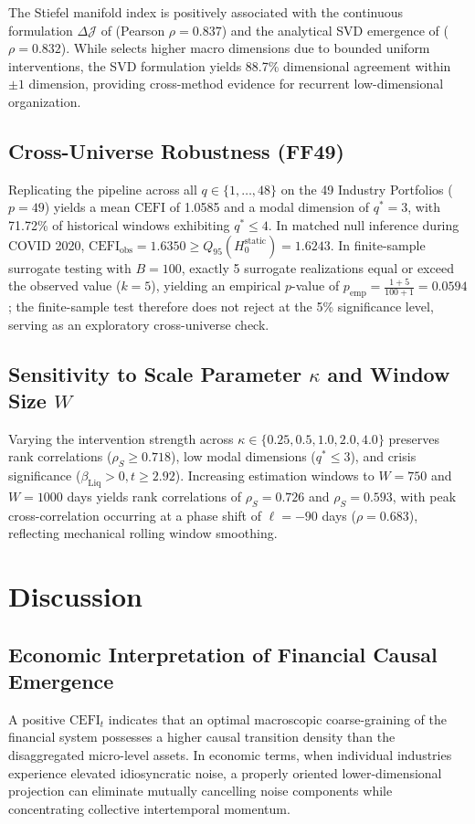 \documentclass[review,12pt,authoryear]{elsarticle}
\begin{document}
The Stiefel manifold index is positively associated with the continuous formulation $\Delta \mathcal{J}$ of \citet{liu2024exact} (Pearson $\rho = 0.837$) and the analytical SVD emergence of \citet{liu2025singular} ($\rho = 0.832$). While \citet{liu2024exact} selects higher macro dimensions due to bounded uniform interventions, the SVD formulation yields 88.7\% dimensional agreement within $\pm 1$ dimension, providing cross-method evidence for recurrent low-dimensional organization.

\subsection{Cross-Universe Robustness (FF49)}
Replicating the pipeline across all $q \in \{1, \dots, 48\}$ on the 49 Industry Portfolios ($p=49$) yields a mean $\mathrm{CEFI}$ of 1.0585 and a modal dimension of $q^* = 3$, with 71.72\% of historical windows exhibiting $q^* \le 4$. In matched null inference during COVID 2020, $\mathrm{CEFI}_{\text{obs}} = 1.6350 \ge Q_{95}(H_0^{\text{static}}) = 1.6243$. In finite-sample surrogate testing with $B=100$, exactly 5 surrogate realizations equal or exceed the observed value ($k=5$), yielding an empirical $p$-value of $p_{\text{emp}} = \frac{1+5}{100+1} = 0.0594$; the finite-sample test therefore does not reject at the 5\% significance level, serving as an exploratory cross-universe check.

\subsection{Sensitivity to Scale Parameter \texorpdfstring{$\kappa$}{kappa} and Window Size \texorpdfstring{$W$}{W}}
Varying the intervention strength across $\kappa \in \{0.25, 0.5, 1.0, 2.0, 4.0\}$ preserves rank correlations ($\rho_S \ge 0.718$), low modal dimensions ($q^* \le 3$), and crisis significance ($\beta_{\text{Liq}} > 0, t \ge 2.92$). Increasing estimation windows to $W = 750$ and $W = 1000$ days yields rank correlations of $\rho_S = 0.726$ and $\rho_S = 0.593$, with peak cross-correlation occurring at a phase shift of $\ell = -90$ days ($\rho = 0.683$), reflecting mechanical rolling window smoothing.

\section{Discussion}
\label{sec:discussion}

\subsection{Economic Interpretation of Financial Causal Emergence}
A positive $\mathrm{CEFI}_t$ indicates that an optimal macroscopic coarse-graining of the financial system possesses a higher causal transition density than the disaggregated micro-level assets. In economic terms, when individual industries experience elevated idiosyncratic noise, a properly oriented lower-dimensional projection can eliminate mutually cancelling noise components while concentrating collective intertemporal momentum.
\end{document}
